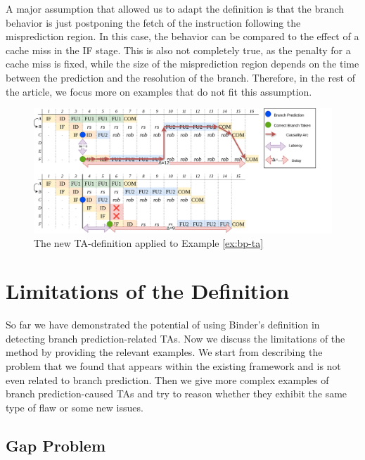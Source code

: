 A major assumption that allowed us to adapt the definition is that the branch behavior is just postponing the fetch of the instruction following the misprediction region. In this case, the behavior can be compared to the effect of a cache miss in the IF stage. This is also not completely true, as the penalty for a cache miss is fixed, while the size of the misprediction region depends on the time between the prediction and the resolution of the branch. Therefore, in the rest of the article, we focus more on examples that do not fit this assumption.



\begin{figure}[H]
    \centering
    \includegraphics[width=\textwidth]{figures/simple-branch-ta-analyzed.png}
    \caption{The new TA-definition applied to Example \ref{ex:bp-ta}}
    \label{fig:bp-ta-analyzed}
\end{figure}

\section{Limitations of the Definition}

So far we have demonstrated the potential of using Binder's definition in detecting branch prediction-related TAs. Now we discuss the limitations of the method by providing the relevant examples. We start from describing the problem that we found that appears within the existing framework and is not even related to branch prediction. Then we give more complex examples of branch prediction-caused TAs and try to reason whether they exhibit the same type of flaw or some new issues.

\subsection{Gap Problem}

